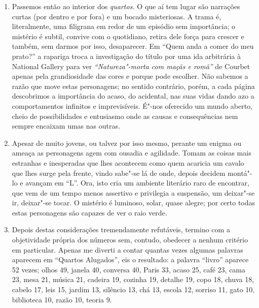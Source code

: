 \begin{enumerate}
\item Passemos então ao interior dos \emph{quartos. }O que aí tem lugar
são narrações curtas (por dentro e por fora) e um bocado misteriosas. A
trama é, literalmente, uma filigrana em redor de um episódio sem
importância; o mistério é subtil, convive com o quotidiano, retira dele
força para crescer e também, sem darmos por isso, desaparecer. Em
``Quem anda a comer do meu prato?'' a rapariga troca a investigação do
título por uma ida arbitrária à National Gallery para ver
\emph{``Natureza"-morta com maçãs e romã''} de Courbet apenas pela grandiosidade
das cores e porque pode escolher. Não sabemos a razão que move estas
personagens; no sentido contrário, porém, a cada página descobrimos a
importância do acaso, do acidental, nas suas vidas dando azo a
comportamentos infinitos e imprevisíveis. É"-nos oferecido um mundo
aberto, cheio de possibilidades e entusiasmo onde as causas e
consequências nem sempre encaixam umas nas outras.

\item Apesar de muito jovens, ou talvez por isso mesmo, perante um enigma ou
ameaça as personagens agem com ousadia e agilidade. Tomam as coisas mais
estranhas e inesperadas que lhes acontecem como quem acaricia um cavalo que lhes surge
pela frente, vindo sabe"-se lá de onde, depois decidem montá"-lo e avançam
em ``L''. Ora, isto cria um ambiente literário raro de encontrar, que
vem de um tempo menos assertivo e privilegia a suspensão, um deixar"-se
ir, deixar"-se tocar. O mistério é luminoso, solar, quase alegre; por
certo todas estas personagens são capazes de ver o raio verde.

\item Depois destas considerações tremendamente refutáveis, termino com a
objetividade própria dos números sem, contudo, obedecer a nenhum
critério em particular. Apenas me diverti a contar quantas vezes algumas
palavras aparecem em ``Quartos Alugados'', eis o resultado: a palavra
``livro'' aparece 52 vezes; olhos 49, janela 40, conversa 40, Paris 33,
acaso 25, café 23, cama 23, mesa 21, música 21, cadeira 19,
cozinha 19, detalhe 19, copo 18, chuva 18, cabelo 17, leis 15,
jardim 13, silêncio 13, chá 13, escola 12, sorriso 11, gato 10,
biblioteca 10, razão 10, teoria 9.
\end{enumerate}

\chapter{}

